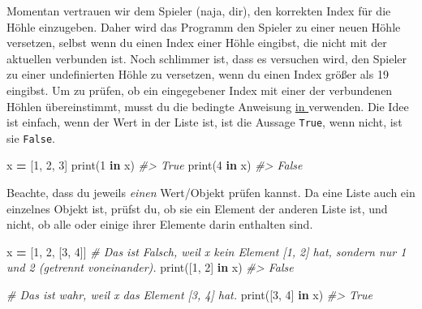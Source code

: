 \documentclass[
]{book}
\newenvironment{Shaded}{\begin{snugshade}}{\end{snugshade}}
\newcommand{\BuiltInTok}[1]{#1}
\newcommand{\CommentTok}[1]{\textcolor[rgb]{0.56,0.35,0.01}{\textit{#1}}}
\newcommand{\DecValTok}[1]{\textcolor[rgb]{0.00,0.00,0.81}{#1}}
\newcommand{\KeywordTok}[1]{\textcolor[rgb]{0.13,0.29,0.53}{\textbf{#1}}}
\newcommand{\NormalTok}[1]{#1}
\newcommand{\OperatorTok}[1]{\textcolor[rgb]{0.81,0.36,0.00}{\textbf{#1}}}
\begin{document}
Momentan vertrauen wir dem Spieler (naja, dir), den korrekten Index für die Höhle einzugeben. Daher wird das Programm den Spieler zu einer neuen Höhle versetzen, selbst wenn du einen Index einer Höhle eingibst, die nicht mit der aktuellen verbunden ist. Noch schlimmer ist, dass es versuchen wird, den Spieler zu einer undefinierten Höhle zu versetzen, wenn du einen Index größer als 19 eingibst. Um zu prüfen, ob ein eingegebener Index mit einer der verbundenen Höhlen übereinstimmt, musst du die bedingte Anweisung \href{https://docs.python.org/3/tutorial/datastructures.html\#more-on-conditions}{ in } verwenden. Die Idee ist einfach, wenn der Wert in der Liste ist, ist die Aussage \texttt{True}, wenn nicht, ist sie \texttt{False}.

\begin{Shaded}
\begin{Highlighting}[]
\NormalTok{x }\OperatorTok{=}\NormalTok{ [}\DecValTok{1}\NormalTok{, }\DecValTok{2}\NormalTok{, }\DecValTok{3}\NormalTok{]}
\BuiltInTok{print}\NormalTok{(}\DecValTok{1} \KeywordTok{in}\NormalTok{ x)}
\CommentTok{\#\textgreater{} True}
\BuiltInTok{print}\NormalTok{(}\DecValTok{4} \KeywordTok{in}\NormalTok{ x)}
\CommentTok{\#\textgreater{} False}
\end{Highlighting}
\end{Shaded}

Beachte, dass du jeweils \emph{einen} Wert/Objekt prüfen kannst. Da eine Liste auch ein einzelnes Objekt ist, prüfst du, ob sie ein Element der anderen Liste ist, und nicht, ob alle oder einige ihrer Elemente darin enthalten sind.

\begin{Shaded}
\begin{Highlighting}[]
\NormalTok{x }\OperatorTok{=}\NormalTok{ [}\DecValTok{1}\NormalTok{, }\DecValTok{2}\NormalTok{, [}\DecValTok{3}\NormalTok{, }\DecValTok{4}\NormalTok{]]}
\CommentTok{\# Das ist Falsch, weil x kein Element [1, 2] hat, sondern nur 1 und 2 (getrennt voneinander).}
\BuiltInTok{print}\NormalTok{([}\DecValTok{1}\NormalTok{, }\DecValTok{2}\NormalTok{] }\KeywordTok{in}\NormalTok{ x)}
\CommentTok{\#\textgreater{} False}

\CommentTok{\# Das ist wahr, weil x das Element [3, 4] hat.}
\BuiltInTok{print}\NormalTok{([}\DecValTok{3}\NormalTok{, }\DecValTok{4}\NormalTok{] }\KeywordTok{in}\NormalTok{ x)}
\CommentTok{\#\textgreater{} True}
\end{Highlighting}
\end{Shaded}
\end{document}
